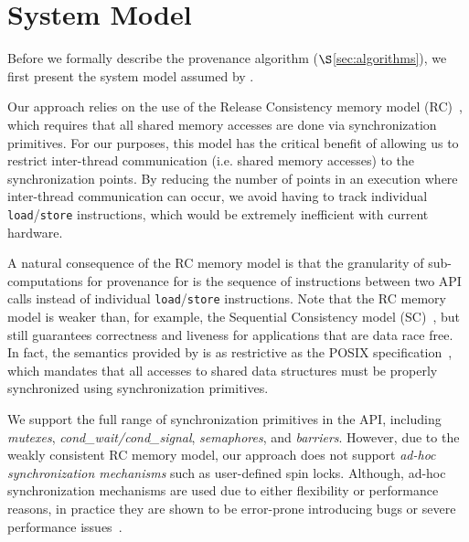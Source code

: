 \section{System Model}
\label{sec:model}

Before we formally describe the provenance algorithm ($\S$\ref{sec:algorithms}),  we first present the system model assumed by \projecttitle.%

 Our approach relies on the use of the
Release Consistency memory model (RC)~\cite{DSM-RC}, which requires that all shared memory accesses are done via synchronization primitives.
For our purposes, this model has the critical
benefit of allowing us to restrict inter-thread communication (i.e. shared
memory accesses) to the synchronization points. By reducing the number of 
points in an execution where inter-thread communication can occur, we avoid
having to track individual {\tt load}/{\tt store} instructions, %
which would be extremely inefficient with current hardware. 

A natural consequence of the RC memory model is that the granularity of sub-computations for provenance for \projecttitle is the sequence of instructions between two \pthreads API calls instead of  individual {\tt load}/{\tt store} instructions. Note that the RC memory model is weaker
than, for example, the Sequential Consistency model (SC)~\cite{scLamport}, but
still guarantees correctness and liveness for applications that are data race
free. In fact,  the semantics provided by
\projecttitle is as restrictive as the POSIX specification~\cite{pthreads-spec}, which mandates that all accesses to shared data structures must be properly synchronized using 
\pthreads synchronization primitives. 

 We support the full range of synchronization
primitives in the \pthreads API, including {\em mutexes}, {\em cond\_wait/cond\_signal}, {\em semaphores},  and {\em
barriers}. However, due to the weakly consistent RC memory model, our approach
does not support {\em ad-hoc synchronization mechanisms} such as user-defined spin locks. 
Although, ad-hoc synchronization mechanisms are used due to either flexibility
or performance reasons, in practice they are shown to be
error-prone introducing bugs or severe performance issues~\cite{adhoc-sync}.
%
